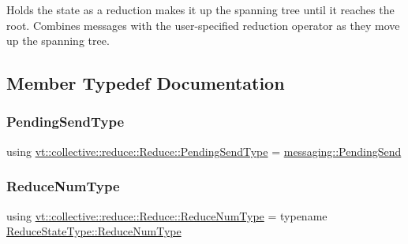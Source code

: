 Holds the state as a reduction makes it up the spanning tree until it reaches the root. Combines messages with the user-\/specified reduction operator as they move up the spanning tree. 

\subsection{Member Typedef Documentation}
\mbox{\label{structvt_1_1collective_1_1reduce_1_1_reduce_a0474b491f3c93014d9a0ce0356c6bfd5}} 
\subsubsection{\texorpdfstring{Pending\+Send\+Type}{PendingSendType}}
{\footnotesize\ttfamily using \hyperlink{structvt_1_1collective_1_1reduce_1_1_reduce_a0474b491f3c93014d9a0ce0356c6bfd5}{vt\+::collective\+::reduce\+::\+Reduce\+::\+Pending\+Send\+Type} =  \hyperlink{structvt_1_1messaging_1_1_pending_send}{messaging\+::\+Pending\+Send}}

\mbox{\label{structvt_1_1collective_1_1reduce_1_1_reduce_a6c3e63aca10c31d2823b0b18cf9762a4}} 
\subsubsection{\texorpdfstring{Reduce\+Num\+Type}{ReduceNumType}}
{\footnotesize\ttfamily using \hyperlink{structvt_1_1collective_1_1reduce_1_1_reduce_a6c3e63aca10c31d2823b0b18cf9762a4}{vt\+::collective\+::reduce\+::\+Reduce\+::\+Reduce\+Num\+Type} =  typename \hyperlink{structvt_1_1collective_1_1reduce_1_1_reduce_state_ae83d217c90b8a8895ca998d7ea9c49e4}{Reduce\+State\+Type\+::\+Reduce\+Num\+Type}}

\mbox{\label{structvt_1_1collective_1_1reduce_1_1_reduce_ab0e89b962f0741718107772505fe6d34}} 
